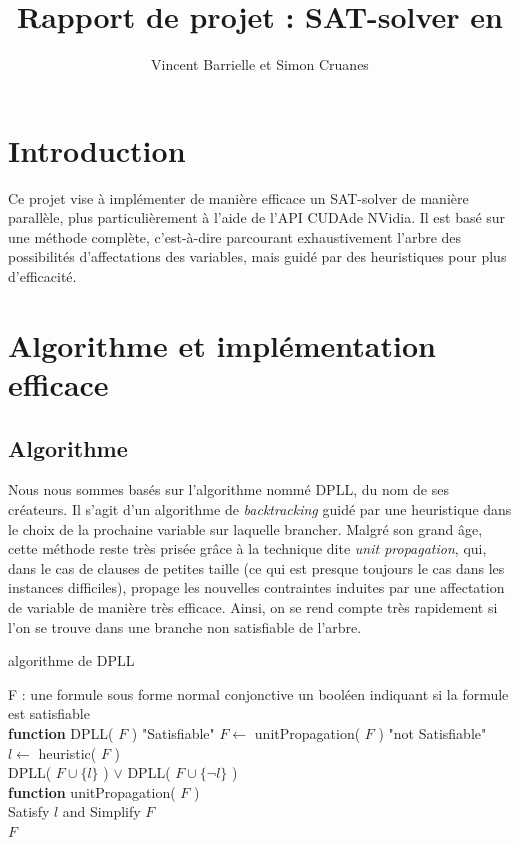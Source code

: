 \documentclass{article}
\author{Vincent Barrielle et Simon Cruanes}
\title{Rapport de projet : \textsc{SAT}-solver en \cuda}
\newcommand{\cuda}{\textsc{CUDA}}
\begin{document}
\maketitle
\tableofcontents%
\newpage

\section{Introduction}
Ce projet vise à implémenter de manière efficace un \textsc{SAT}-solver de manière parallèle, plus particulièrement à l'aide de l'\textsc{API} \cuda de NVidia. Il est basé sur une méthode complète, c'est-à-dire parcourant exhaustivement l'arbre des possibilités d'affectations des variables, mais guidé par des heuristiques pour plus d'efficacité.

\section{Algorithme et implémentation efficace}
\subsection{Algorithme}
Nous nous sommes basés sur l'algorithme nommé \textsc{DPLL}, du nom de ses créateurs. Il s'agit d'un algorithme de \emph{backtracking} guidé par une heuristique dans le choix de la prochaine variable sur laquelle brancher. Malgré son grand âge, cette méthode reste très prisée grâce à la technique dite \emph{unit propagation}, qui, dans le cas de clauses de petites taille (ce qui est presque toujours le cas dans les instances difficiles), propage les nouvelles contraintes induites par une affectation de variable de manière très efficace. Ainsi, on se rend compte très rapidement si l'on se trouve dans une branche non satisfiable de l'arbre.\par

\begin{algorithm}[h!]
\caption{algorithme de \textsc{DPLL}}\label{alg:DPLL}
\begin{algorithmic}
\REQUIRE F : une formule sous forme normal conjonctive
\ENSURE un booléen indiquant si la formule est satisfiable \\
\medskip
\textbf{function} DPLL( $F$ )
    \RETURN "Satisfiable"
  \ENDIF
  \STATE $F \gets$ unitPropagation( $F$ )
    \RETURN "not Satisfiable"
  \ENDIF
  \STATE $l \gets$ heuristic( $F$ ) \\
  \RETURN DPLL( $F \cup\{l\}$ ) $\vee$ DPLL( $F \cup \{\lnot l\}$ ) \\
\medskip
\textbf{function} unitPropagation( $F$ )\\
  Satisfy $l$ and Simplify $F$ \\
  \RETURN $F$
\ENDWHILE
\end{algorithmic}
\end{algorithm}
\end{document}
